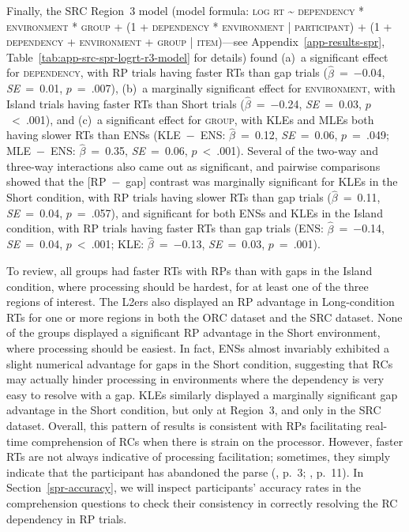 Finally, the SRC Region~3 model (model formula: \textsc{log rt \~{} dependency * environment * group + (1 + dependency * environment | participant) + (1 + dependency + environment + group | item)}---see Appendix~\ref{app-results-spr}, Table~\ref{tab:app-src-spr-logrt-r3-model} for details) found (a)~a significant effect for \textsc{dependency}, with RP trials having faster RTs than gap trials ($\hat{\beta}$~=~−0.04, \textit{SE}~=~0.01, $p$~=~.007), (b)~a marginally significant effect for \textsc{environment}, with Island trials having faster RTs than Short trials ($\hat{\beta}$~=~−0.24, \textit{SE}~=~0.03, $p$~<~.001), and (c)~a significant effect for \textsc{group}, with KLEs and MLEs both having slower RTs than ENSs (KLE~−~ENS: $\hat{\beta}$~=~0.12, \textit{SE}~=~0.06, $p$~=~.049; MLE~−~ENS: $\hat{\beta}$~=~0.35, \textit{SE}~=~0.06, $p$~<~.001). Several of the two-way and three-way interactions also came out as significant, and pairwise comparisons showed that the [RP~−~gap] contrast was marginally significant for KLEs in the Short condition, with RP trials having slower RTs than gap trials ($\hat{\beta}$~=~0.11, \textit{SE}~=~0.04, $p$~=~.057), and significant for both ENSs and KLEs in the Island condition, with RP trials having faster RTs than gap trials (ENS: $\hat{\beta}$~=~−0.14, \textit{SE}~=~0.04, $p$~<~.001; KLE: $\hat{\beta}$~=~−0.13, \textit{SE}~=~0.03, $p$~=~.001).

To review, all groups had faster RTs with RPs than with gaps in the Island condition, where processing should be hardest, for at least one of the three regions of interest. The L2ers also displayed an RP advantage in Long-condition RTs for one or more regions in both the ORC dataset and the SRC dataset. None of the groups displayed a significant RP advantage in the Short environment, where processing should be easiest. In fact, ENSs almost invariably exhibited a slight numerical advantage for gaps in the Short condition, suggesting that RCs may actually hinder processing in environments where the dependency is very easy to resolve with a gap. KLEs similarly displayed a marginally significant gap advantage in the Short condition, but only at Region~3, and only in the SRC dataset. Overall, this pattern of results is consistent with RPs facilitating real-time comprehension of RCs when there is strain on the processor. However, faster RTs are not always indicative of processing facilitation; sometimes, they simply indicate that the participant has abandoned the parse (\cite{morgan.etal2020}, p.~3; \cite{nicenboim.etal2016}, p.~11). In Section~\ref{spr-accuracy}, we will inspect participants' accuracy rates in the comprehension questions to check their consistency in correctly resolving the RC dependency in RP trials.

